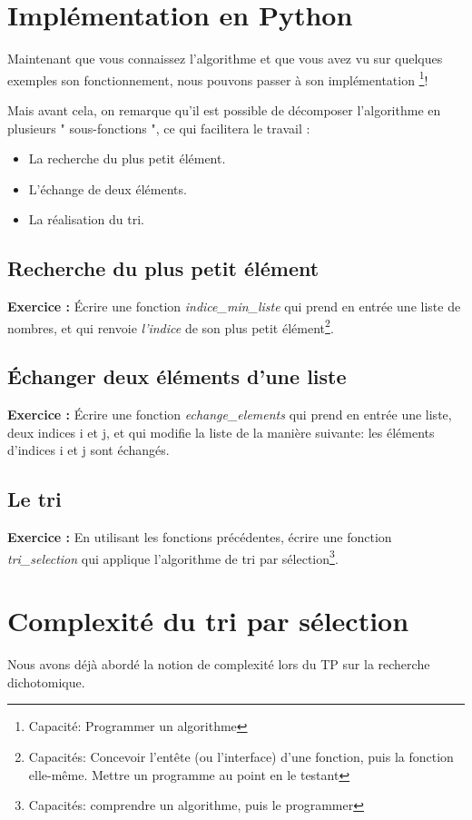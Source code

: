 \documentclass{article}
\newcounter{exo}
\newcommand{\exercice}{
\stepcounter{exo}
\noindent\textbf{Exercice \theexo :}
}
\begin{document}
\section{Implémentation en Python}
Maintenant que vous connaissez l'algorithme et que vous avez vu sur quelques exemples son fonctionnement, nous pouvons passer à son implémentation \footnote{Capacité: Programmer un algorithme}!

Mais avant cela, on remarque qu'il est possible de décomposer l'algorithme en plusieurs " sous-fonctions ", ce qui facilitera le travail :
\begin{itemize}
\setlength{\itemsep}{1pt}
     \setlength{\parskip}{0pt}
     \setlength{\parsep}{0pt}
	\item La recherche du plus petit élément.
	\item L'échange de deux éléments.
	\item La réalisation du tri.
\end{itemize}

\subsection{Recherche du plus petit élément}
\exercice \'Ecrire une fonction \emph{indice\_min\_liste} qui prend en entrée une liste de nombres, et qui renvoie \emph{l'indice} de son plus petit élément\footnote{Capacités: Concevoir l'entête (ou l'interface) d'une fonction, puis la fonction elle-même. Mettre un programme au point en le testant}.
\subsection{\'Echanger deux éléments d'une liste}
\exercice \'Ecrire une fonction \emph{echange\_elements} qui prend en entrée une liste, deux indices i et j, et qui modifie la liste de la manière suivante: les éléments d'indices i et j sont échangés.

\subsection{Le tri}
\exercice En utilisant les fonctions précédentes, écrire une fonction \emph{tri\_selection} qui applique l'algorithme de tri par sélection\footnote{Capacités: comprendre un algorithme, puis le programmer}.

\section{Complexité du tri par sélection}
Nous avons déjà abordé la notion de complexité lors du TP sur la recherche dichotomique.
\end{document}
